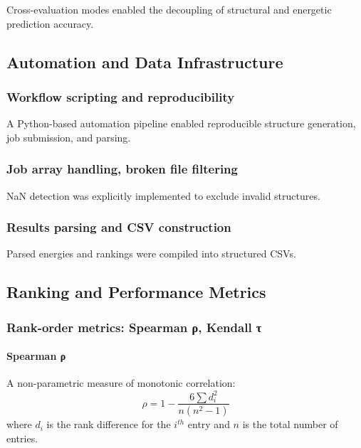 Cross-evaluation modes enabled the decoupling of structural and energetic prediction accuracy.

\subsection{Automation and Data Infrastructure}

\subsubsection{Workflow scripting and reproducibility}

A Python-based automation pipeline enabled reproducible structure generation, job submission, and parsing.


\subsubsection{Job array handling, broken file filtering}

NaN detection was explicitly implemented to exclude invalid structures.

\subsubsection{Results parsing and CSV construction}

Parsed energies and rankings were compiled into structured CSVs.

\subsection{Ranking and Performance Metrics}

\subsubsection{Rank-order metrics: Spearman ρ, Kendall τ}

\paragraph{Spearman ρ}

A non-parametric measure of monotonic correlation: \[ \rho = 1 - \frac{6 \sum d_i^2}{n(n^2 - 1)} \] where \(d_i\) is the rank difference for the \(i^{th}\) entry and \(n\) is the total number of entries.

